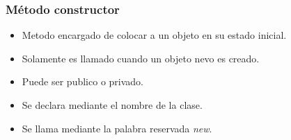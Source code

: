 \documentclass{beamer}
\begin{document}
\begin{frame}
\frametitle{M\'etodo constructor}
\begin{itemize}
    \item Metodo encargado de colocar a un objeto en su estado inicial.
    \item Solamente es llamado cuando un objeto nevo es creado.
    \item Puede ser publico o privado.
    \item Se declara mediante el nombre de la clase.
    \item Se llama mediante la palabra reservada \emph{new}.
\end{itemize}
\end{frame}
\end{document}
